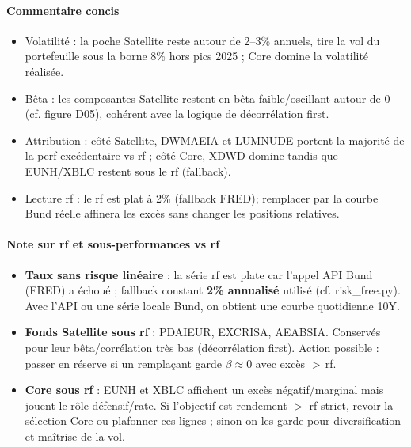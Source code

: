 \documentclass{article}
\begin{document}
\paragraph{Commentaire concis}
\begin{itemize}
    \item Volatilité : la poche Satellite reste autour de 2--3\% annuels, tire la vol du portefeuille sous la borne 8\% hors pics 2025 ; Core domine la volatilité réalisée.
    \item Bêta : les composantes Satellite restent en bêta faible/oscillant autour de 0 (cf. figure D05), cohérent avec la logique de décorrélation first.
    \item Attribution : côté Satellite, DWMAEIA et LUMNUDE portent la majorité de la perf excédentaire vs rf ; côté Core, XDWD domine tandis que EUNH/XBLC restent sous le rf (fallback).
    \item Lecture rf : le rf est plat à 2\% (fallback FRED); remplacer par la courbe Bund réelle affinera les excès sans changer les positions relatives.
\end{itemize}

\paragraph{Note sur rf et sous-performances vs rf}
\begin{itemize}
    \item \textbf{Taux sans risque linéaire} : la série rf est plate car l’appel API Bund (FRED) a échoué ; fallback constant \textbf{2\% annualisé} utilisé (cf. risk\_free.py). Avec l’API ou une série locale Bund, on obtient une courbe quotidienne 10Y.
    \item \textbf{Fonds Satellite sous rf} : PDAIEUR, EXCRISA, AEABSIA. Conservés pour leur bêta/corrélation très bas (décorrélation first). Action possible : passer en réserve si un remplaçant garde $\beta \approx 0$ avec excès $>\,$rf.
    \item \textbf{Core sous rf} : EUNH et XBLC affichent un excès négatif/marginal mais jouent le rôle défensif/rate. Si l’objectif est rendement $>$ rf strict, revoir la sélection Core ou plafonner ces lignes ; sinon on les garde pour diversification et maîtrise de la vol.
\end{itemize}
\end{document}
